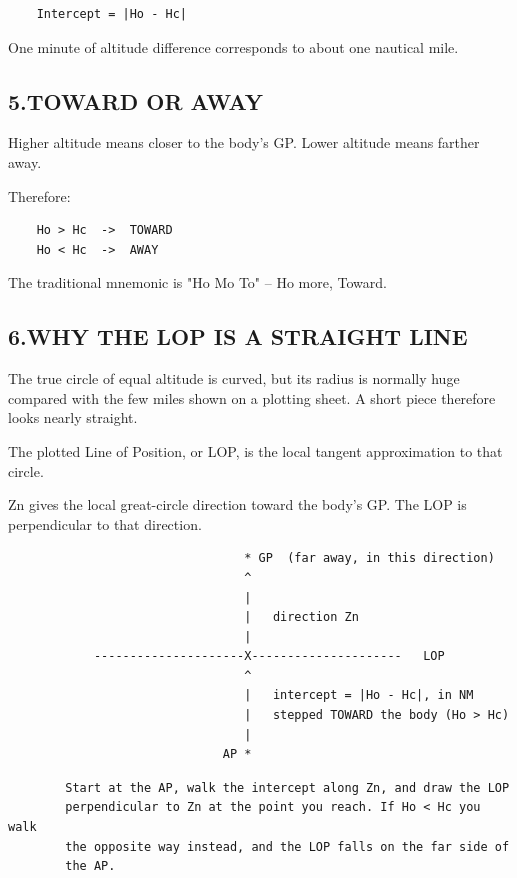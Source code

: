 \documentclass[11pt]{article}
\begin{document}
\begin{verbatim}
    Intercept = |Ho - Hc|
\end{verbatim}

One minute of altitude difference corresponds to about one nautical mile.

\subsection*{5.\quad TOWARD OR AWAY}

Higher altitude means closer to the body's GP. Lower altitude means farther away.

Therefore:

\begin{verbatim}
    Ho > Hc  ->  TOWARD
    Ho < Hc  ->  AWAY
\end{verbatim}

The traditional mnemonic is "Ho Mo To" -- Ho more, Toward.

\subsection*{6.\quad WHY THE LOP IS A STRAIGHT LINE}

The true circle of equal altitude is curved, but its radius is normally huge compared with the few miles shown on a plotting sheet. A short piece therefore looks nearly straight.

The plotted Line of Position, or LOP, is the local tangent approximation to that circle.

Zn gives the local great-circle direction toward the body's GP. The LOP is perpendicular to that direction.

\begin{verbatim}
                                 * GP  (far away, in this direction)
                                 ^
                                 |
                                 |   direction Zn
                                 |
            ---------------------X---------------------   LOP
                                 ^
                                 |   intercept = |Ho - Hc|, in NM
                                 |   stepped TOWARD the body (Ho > Hc)
                                 |
                              AP *
\end{verbatim}

\begin{verbatim}
        Start at the AP, walk the intercept along Zn, and draw the LOP
        perpendicular to Zn at the point you reach. If Ho < Hc you walk
        the opposite way instead, and the LOP falls on the far side of
        the AP.
\end{verbatim}
\end{document}
